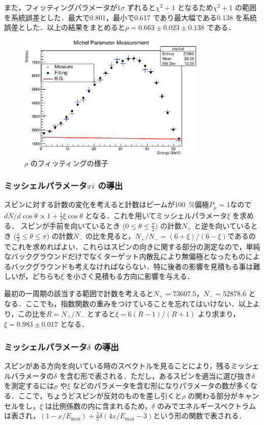 また，フィッティングパラメータが$1\sigma$ ずれると$\chi^{2}+1$ となるため$\chi^{2} + 1$ の範囲を系統誤差とした．最大で0.801，最小で0.617 であり最大幅である0.138 を系統誤差とした．以上の結果をまとめると$\rho=0.663 \pm 0.023 \pm 0.138$ である．

\begin{figure}[hbt]
\centering
\includegraphics[width=0.8\textwidth]{figure/hatano/rho.eps}
\caption{$\rho$ のフィッティングの様子}
\label{hatano_fig:rho}
\end{figure}

\subsubsection{ミッシェルパラメータ$xi$ の導出}
スピンに対する計数の変化を考えると計数はビームが100~\%偏極$P_{\mu} = 1$なので$dN / d \cos \theta \propto 1 + \frac{1}{3} \xi \cos \theta$ となる．これを用いてミッシェルパラメータ$\xi$ を求める．
スピンが手前を向いているとき ($0\leq\theta\leq\frac{\pi}{2}$) の計数$N_+$ と逆を向いているとき ($\frac{\pi}{2}\leq\theta\leq\pi$) の計数$N_-$ の比を見ると，$N_{+} / N_{-} =  (6 + \xi) / (6 -\xi)$であるのでこれを求めればよい．これらはスピンの向きに関する部分の測定なので，単純なバックグラウンドだけでなくターゲット内散乱により無偏極となったものによるバックグラウンドも考えなければならない．特に後者の影響を見積もる事は難しいが，どちらも$\xi$ を小さく見積もる方向に影響を与える．

最初の一周期の該当する範囲で計数を考えると$N_+=73607.5$，$N_-=52878.6$ となる．ここでも，指数関数の重みをつけていることを忘れてはいけない．以上より，この比を$R=N_{+} / N_{-}$ とすると$\xi=6(R-1) / (R+1)$ より求まり，$\xi=0.983\pm0.017$ となる．

\subsubsection{ミッシェルパラメータ$\delta$ の導出}
スピンがある方向を向いている時のスペクトルを見ることにより，残るミッシェルパラメータの$\delta$ を含む形で表される．ただし，あるスピンを適当に選び抜き$\delta$ を測定するには$\rho$ や$\xi$ などのパラメータを含む形になりパラメータの数が多くなる．ここで，ちょうどスピンが反対のものを差し引くと$\rho$ の関わる部分がキャンセルをし，$\xi$ は比例係数の内に含まれるため，$\delta$ のみでエネルギースペクトラムは表され，$(1-x / E_\mathrm{max})+\frac{2}{3}\delta(4x / E_\mathrm{max} - 3)$という形の関数で表される．

